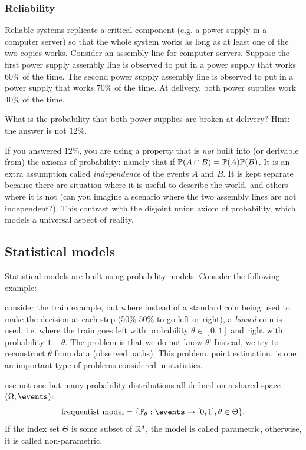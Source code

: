 \documentclass{article}
\begin{document}
\subsubsection{Reliability}\label{sec:reliability}

Reliable systems replicate a critical component (e.g. a power supply in a computer server) so that the whole system works as long as at least one of the two copies works. Consider an assembly line for computer servers. Suppose the first power supply assembly line is observed to put in a power supply that works $60\%$ of the time. The second  power supply assembly line  is observed to put in a power supply that works $70\%$ of the time. At delivery, both power supplies work $40\%$ of the time. 

 What is the probability that both power supplies are broken at delivery? Hint: the answer is not $12\%$. 

If you answered $12\%$, you are using a property that is \emph{not} built into (or derivable from) the axioms of probability: namely that if $\P(A \cap B) = \P(A) \P(B)$. It is an extra assumption called \emph{independence} of the events $A$ and $B$. It is kept separate because there are situation where it is useful to describe the world, and others where it is not (can you imagine a scenario where the two assembly lines are not independent?). This contrast with the disjoint union axiom of probability, which models a universal aspect of reality. 


\subsection{Statistical models}\label{sec:statistical-model}

Statistical models are built using probability models. Consider the following example:

 consider the train example, but where instead of a standard coin being used to make the decision at each step (50\%-50\% to go left or right), a \emph{biased} coin is used, i.e. where the train goes left with probability $\theta\in [0, 1]$ and right with probability $1 - \theta$. The problem is that we do not know $\theta$! Instead, we try to reconstruct $\theta$ from data (observed paths). This problem, point estimation, is one an important type of problems considered in statistics. 

 use not one but many probability distributions all defined on a shared space $(\Omega, \events)$:
\[ \text{frequentist model} = \{ \P_\theta : \events \to [0, 1], \theta \in \Theta\}. \]
If the index set $\Theta$ is some subset of $\R^d$, the model is called parametric, otherwise, it is called non-parametric.
\end{document}
